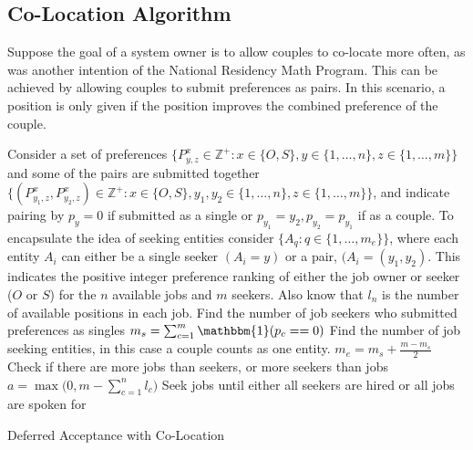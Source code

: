 \subsection{Co-Location Algorithm}

Suppose the goal of a system owner is to allow couples to co-locate more often, as was another intention of the National Residency Math Program. This can be achieved by allowing couples to submit preferences as pairs. In this scenario, a position is only given if the position improves the combined preference of the couple.

\begin{algorithm}[H]
\SetAlgoLined
{} 
 Consider a set of preferences $\{P^{x}_{y,z} \in \mathbb{Z}^+: x \in \{O,S\}, y \in \{1, \dots, n\}, z \in \{1, \dots, m\}\}$ and some of the pairs are submitted together $\{(P^{x}_{y_1,z}, P^{x}_{y_2,z}) \in \mathbb{Z}^+: x \in \{O,S\}, y_1,y_2 \in \{1, \dots, n\}, z \in \{1, \dots, m\}\}$, and indicate pairing by $p_y = 0$ if submitted as a single or $p_{y_1}=y_2, p_{y_2}=p_{y_1}$ if as a couple. To encapsulate the idea of seeking entities consider $\{A_q : q \in \{1, \dots, m_e\}\}$, where each entity $A_i$ can either be a single seeker $(A_i = y)$ or a pair, $(A_i = (y_1, y_2)$. This indicates the positive integer preference ranking of either the job owner or seeker ($O$ or $S$) for the $n$ available jobs and $m$ seekers. Also know that $l_n$ is the number of available positions in each job.\;
 Find the number of job seekers who submitted preferences as singles \;
 $m_s =  \sum_{c=1}^m \mathbbm{1}(p_c == 0)$ \;
 Find the number of job seeking entities, in this case a couple counts as one entity. \;
 $m_e = m_s + \frac{m - m_s}{2} $ \;
 Check if there are more jobs than seekers, or more seekers than jobs \;
 $a = \max \big(0, m - \sum_{c = 1}^n l_c \big)$\;
 Seek jobs until either all seekers are hired or all jobs are spoken for \;
 \caption{Deferred Acceptance with Co-Location}
\end{algorithm}

